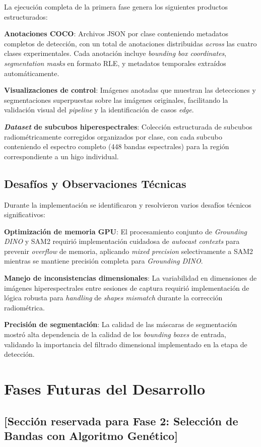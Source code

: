La ejecución completa de la primera fase genera los siguientes productos estructurados:

\textbf{Anotaciones COCO}: Archivos JSON por clase conteniendo metadatos completos de detección, con un total de anotaciones distribuidas \emph{across} las cuatro clases experimentales. Cada anotación incluye \emph{bounding box coordinates}, \emph{segmentation masks} en formato RLE, y metadatos temporales extraídos automáticamente.


\textbf{Visualizaciones de control}: Imágenes anotadas que muestran las detecciones y segmentaciones superpuestas sobre las imágenes originales, facilitando la validación visual del \emph{pipeline} y la identificación de casos \emph{edge}.

\textbf{\emph{Dataset} de subcubos hiperespectrales}: Colección estructurada de subcubos radiométricamente corregidos organizados por clase, con cada subcubo conteniendo el espectro completo (448 bandas espectrales) para la región correspondiente a un higo individual.

\subsection{Desafíos y Observaciones Técnicas}

Durante la implementación se identificaron y resolvieron varios desafíos técnicos significativos:

\textbf{Optimización de memoria GPU}: El procesamiento conjunto de \emph{Grounding DINO} y SAM2 requirió implementación cuidadosa de \emph{autocast contexts} para prevenir \emph{overflow} de memoria, aplicando \emph{mixed precision} selectivamente a SAM2 mientras se mantiene precisión completa para \emph{Grounding DINO}.

\textbf{Manejo de inconsistencias dimensionales}: La variabilidad en dimensiones de imágenes hiperespectrales entre sesiones de captura requirió implementación de lógica robusta para \emph{handling} de \emph{shapes mismatch} durante la corrección radiométrica.

\textbf{Precisión de segmentación}: La calidad de las máscaras de segmentación mostró alta dependencia de la calidad de los \emph{bounding boxes} de entrada, validando la importancia del filtrado dimensional implementado en la etapa de detección.

\section{Fases Futuras del Desarrollo}

\subsection{[Sección reservada para Fase 2: Selección de Bandas con Algoritmo Genético]}
